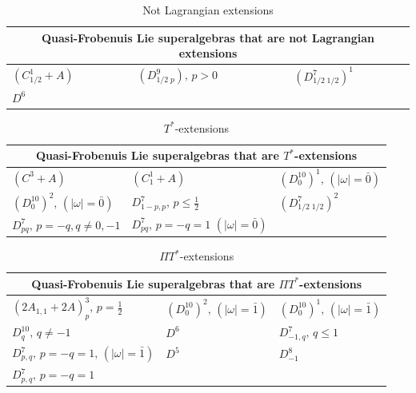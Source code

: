 \documentclass[12pt]{amsart}
\begin{document}
\begin{table}[ht]
\centering
\renewcommand{\arraystretch}{1.2}
\begin{tabular}{lll}
\hline
\multicolumn{3}{c}{Quasi-Frobenuis Lie superalgebras that are {\bf not} Lagrangian extensions} \\
\hline
$(C_{1/2}^1+A)$ & $(D^9_{1/2\; p}), \, p>0$ & $(D^7_{1/2\; 1/2})^1$\\[2mm] $D^6$ & & \\
\hline
\end{tabular}
\caption{Not Lagrangian extensions}
\label{tab:NLQF}
\end{table}
\begin{table}[ht]
\centering
\renewcommand{\arraystretch}{1.2}
\begin{tabular}{lll}
\hline
\multicolumn{3}{c}{Quasi-Frobenuis Lie superalgebras that are  $T^*$-extensions} \\
\hline
$(C^3+A)$ &   $(C_1^1+A)$ &  $(D_0^{10})^1, \, (|\omega|=\bar 0)$\\[2mm]  
$(D_0^{10})^2, \, (|\omega|=\bar 0)$&  $D^7_{1-p,p}, \, p\leq \frac{1}{2}$ & $(D^7_{1/2 \; 1/2})^2$\\[2mm] 
$D^7_{pq},\, p=-q, q\not =0,-1$ & $D^7_{pq},\, p=-q=1$ $(|\omega|=\bar 0)$ &   \\
\hline
\end{tabular}
\caption{$T^*$-extensions}
\label{tab:TQF}
\end{table}
\begin{table}[ht]
\centering
\renewcommand{\arraystretch}{1.2}
\begin{tabular}{lll}
\hline
\multicolumn{3}{c}{Quasi-Frobenuis Lie superalgebras that are  $\Pi T^*$-extensions} \\
\hline 
$(2A_{1,1}+2A)^3_p, \, p=\frac{1}{2}$&  $(D_0^{10})^2, \, (|\omega|=\bar 1)$ &  $(D_0^{10})^1,\, (|\omega|=\bar 1)$\\ 
$D^{10}_q, \, q \not =-1$ &  $D^6$ &  
$D^7_{-1,q},\, q\leq 1$\\[2mm] $D^7_{p,q}, \, p=-q=1,\, (|\omega|=\bar 1)$ &  $D^5$ &  $D^8_{-1}$\\[2mm] 
$D^7_{p,q}, \, p=-q=1$  & &\\
\hline
\end{tabular}
\caption{$\Pi T^*$-extensions}
\label{tab:PTQF}
\end{table}
\end{document}
